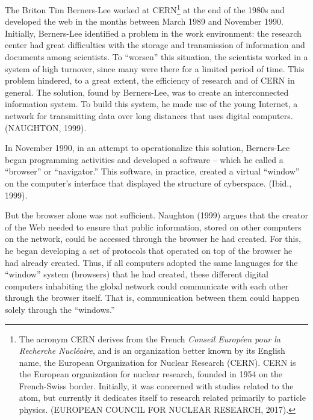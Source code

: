 The Briton Tim Berners-Lee worked at CERN\footnote{The acronym CERN derives from the French \textit{Conseil Europ\'{e}en pour la Recherche Nucl\'{e}aire}, and is an organization better known by its English name, the European Organization for Nuclear Research (CERN). CERN is the European organization for nuclear research, founded in 1954 on the French-Swiss border. Initially, it was concerned with studies related to the atom, but currently it dedicates itself to research related primarily to particle physics. (EUROPEAN COUNCIL FOR NUCLEAR RESEARCH, 2017).} at the end of the 1980s and developed the web in the months between March 1989 and November 1990. Initially, Berners-Lee identified a problem in the work environment: the research center had great difficulties with the storage and transmission of information and documents among scientists. To ``worsen'' this situation, the scientists worked in a system of high turnover, since many were there for a limited period of time. This problem hindered, to a great extent, the efficiency of research and of CERN in general. The solution, found by Berners-Lee, was to create an interconnected information system. To build this system, he made use of the young Internet, a network for transmitting data over long distances that uses digital computers. (NAUGHTON, 1999).

In November 1990, in an attempt to operationalize this solution, Berners-Lee began programming activities and developed a software -- which he called a ``browser'' or ``navigator.'' This software, in practice, created a virtual ``window'' on the computer's interface that displayed the structure of cyberspace. (Ibid., 1999).

But the browser alone was not sufficient. Naughton (1999) argues that the creator of the Web needed to ensure that public information, stored on other computers on the network, could be accessed through the browser he had created. For this, he began developing a set of protocols that operated on top of the browser he had already created. Thus, if all computers adopted the same languages for the ``window'' system (browsers) that he had created, these different digital computers inhabiting the global network could communicate with each other through the browser itself. That is, communication between them could happen solely through the ``windows.''

